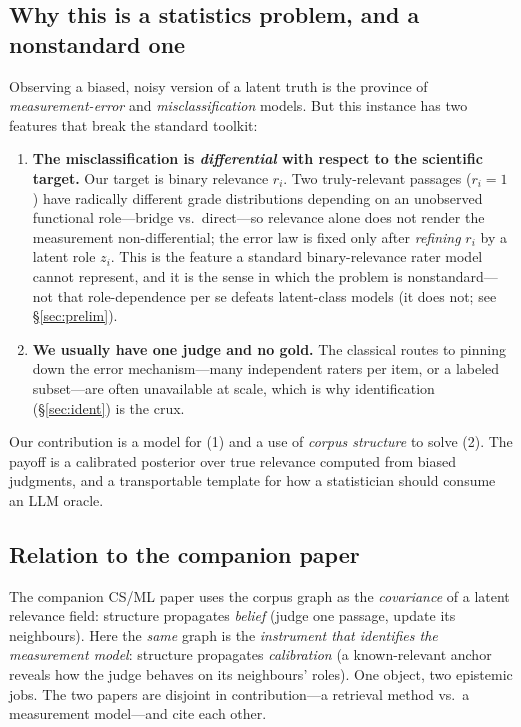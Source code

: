 \documentclass[11pt]{article}
\begin{document}
\subsection{Why this is a statistics problem, and a nonstandard one}
Observing a biased, noisy version of a latent truth is the province of \emph{measurement-error} and
\emph{misclassification} models. But this instance has two features that break the standard toolkit:
\begin{enumerate}[leftmargin=*,itemsep=1pt]
  \item \textbf{The misclassification is \emph{differential} with respect to the scientific target.} Our target
  is binary relevance $r_i$. Two truly-relevant passages ($r_i{=}1$) have radically different grade
  distributions depending on an unobserved functional role---bridge vs.\ direct---so relevance alone does not
  render the measurement non-differential; the error law is fixed only after \emph{refining} $r_i$ by a latent
  role $z_i$. This is the feature a standard binary-relevance rater model cannot represent, and it is the sense
  in which the problem is nonstandard---not that role-dependence per se defeats latent-class models (it does
  not; see \S\ref{sec:prelim}).
  \item \textbf{We usually have one judge and no gold.} The classical routes to pinning down the error
  mechanism---many independent raters per item, or a labeled subset---are often unavailable at scale, which is
  why identification (\S\ref{sec:ident}) is the crux.
\end{enumerate}
Our contribution is a model for (1) and a use of \emph{corpus structure} to solve (2). The payoff is a
calibrated posterior over true relevance computed from biased judgments, and a transportable template for how a
statistician should consume an LLM oracle.

\subsection{Relation to the companion paper}
The companion CS/ML paper uses the corpus graph as the \emph{covariance} of a latent relevance field: structure
propagates \emph{belief} (judge one passage, update its neighbours). Here the \emph{same} graph is the
\emph{instrument that identifies the measurement model}: structure propagates \emph{calibration} (a known-relevant
anchor reveals how the judge behaves on its neighbours' roles). One object, two epistemic jobs. The two papers
are disjoint in contribution---a retrieval method vs.\ a measurement model---and cite each other.
\end{document}
